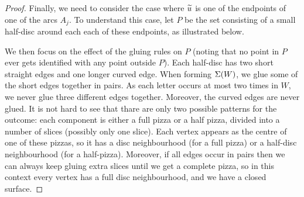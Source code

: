 \documentclass[reqno]{amsart}
\theoremstyle{definition}
\begin{document}
\begin{proof}
 Finally, we need to consider the case where $\widetilde{u}$ is one of the
 endpoints of one of the arcs $A_j$.  To understand this case, let $P$
 be the set consisting of a small half-disc around each each of these
 endpoints, as illustrated below.
 \begin{center}
 \end{center}
 We then focus on the effect of the gluing rules on $P$ (noting that
 no point in $P$ ever gets identified with any point outside $P$).
 Each half-disc has two short straight edges and one longer curved
 edge.  When forming $\Sigma(W)$, we glue some of the short edges
 together in pairs.  As each letter occurs at most two times in $W$,
 we never glue three different edges together.  Moreover, the curved
 edges are never glued.  It is not hard to see that thare are only two
 possible patterns for the outcome: each component is either a full
 pizza or a half pizza, divided into a number of slices (possibly only
 one slice).  Each vertex appears as the centre of one of these
 pizzas, so it has a disc neighbourhood (for a full pizza) or a
 half-disc neighbourhood (for a half-pizza).  Moreover, if all edges
 occur in pairs then we can always keep gluing extra slices until we
 get a complete pizza, so in this context every vertex has a full disc
 neighbourhood, and we have a closed surface.
\end{proof}
\end{document}
